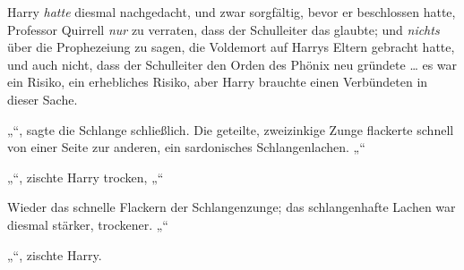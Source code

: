 Harry \emph{hatte} diesmal nachgedacht, und zwar sorgfältig, bevor er beschlossen hatte, Professor Quirrell \emph{nur} zu verraten, dass der Schulleiter das glaubte; und \emph{nichts} über die Prophezeiung zu sagen, die Voldemort auf Harrys Eltern gebracht hatte, und auch nicht, dass der Schulleiter den Orden des Phönix neu gründete … es war ein Risiko, ein erhebliches Risiko, aber Harry brauchte einen Verbündeten in dieser Sache.

„“, sagte die Schlange schließlich. Die geteilte, zweizinkige Zunge flackerte schnell von einer Seite zur anderen, ein sardonisches Schlangenlachen. „“

„“, zischte Harry trocken, „“

Wieder das schnelle Flackern der Schlangenzunge; das schlangenhafte Lachen war diesmal stärker, trockener. „“

„“, zischte Harry.

